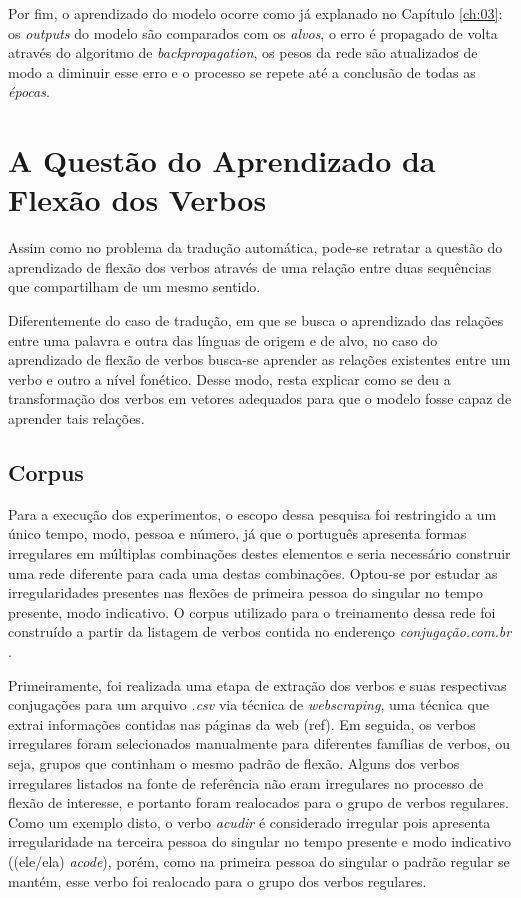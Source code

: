  
 
 Por fim, o aprendizado do modelo ocorre como já explanado no Capítulo \ref{ch:03}: os \textit{outputs} do modelo são comparados com os \textit{alvos}, o erro é propagado de volta através do algoritmo de \textit{backpropagation}, os pesos da rede são atualizados de modo a diminuir esse erro e o processo se repete até a conclusão de todas as \textit{épocas}.
 
\section{A Questão do Aprendizado da Flexão dos Verbos}

Assim como no problema da tradução automática, pode-se retratar a questão do aprendizado de flexão dos verbos através de uma relação entre duas sequências que compartilham de um mesmo sentido.



Diferentemente do caso de tradução, em que se busca o aprendizado das relações entre uma palavra e outra das línguas de origem e de alvo, no caso do aprendizado de flexão de verbos busca-se aprender as relações existentes entre um verbo e outro a nível fonético. Desse modo, resta explicar como se deu a transformação dos verbos em vetores adequados para que o modelo fosse capaz de aprender tais relações.

\subsection{Corpus}

Para a execução dos experimentos, o escopo dessa pesquisa foi restringido a um único tempo, modo, pessoa e número, já que o português apresenta formas irregulares em múltiplas combinações destes elementos e seria necessário construir uma rede diferente para cada uma destas combinações. Optou-se por estudar as irregularidades presentes nas flexões de primeira pessoa do singular no tempo presente, modo indicativo.  
O corpus utilizado para o treinamento dessa rede foi construído a partir da listagem de verbos contida no enderenço \textit{conjugação.com.br} \cite{conjugacao.com.br}.

Primeiramente, foi realizada uma etapa de extração dos verbos e suas respectivas conjugações para um arquivo \textit{.csv} via técnica de \textit{webscraping}, uma técnica que extrai informações contidas nas páginas da web (ref). Em seguida, os verbos irregulares foram selecionados manualmente para diferentes famílias de verbos, ou seja, grupos que continham o mesmo padrão de flexão. Alguns dos verbos irregulares listados na fonte de referência não eram irregulares no processo de flexão de interesse, e portanto foram realocados para o grupo de verbos regulares. Como um exemplo disto, o verbo \textit{acudir} é considerado irregular pois apresenta irregularidade na terceira pessoa do singular no tempo presente e modo indicativo ((ele/ela) \textit{acode}), porém, como na primeira pessoa do singular o padrão regular se mantém, esse verbo foi realocado para o grupo dos verbos regulares. 

